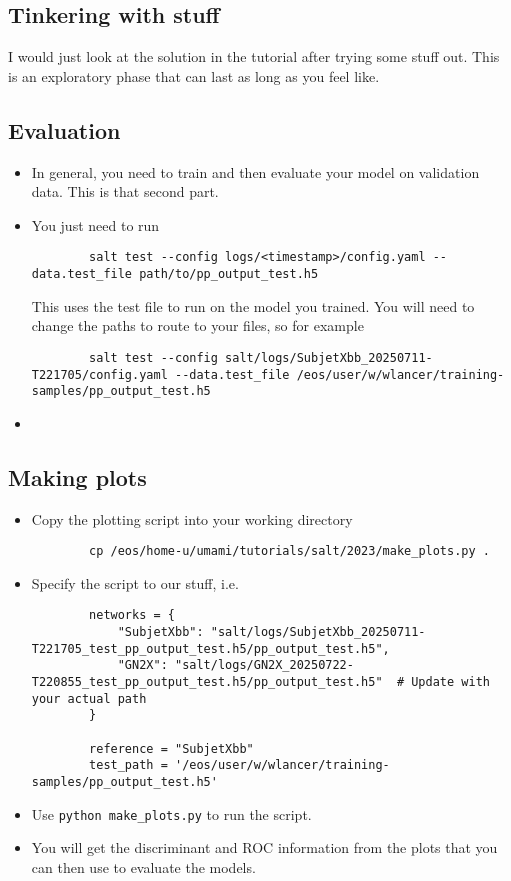 \documentclass[11pt]{article}
\begin{document}
\subsection{Tinkering with stuff}

I would just look at the solution in the tutorial after trying 
some stuff out. This is an exploratory phase that can last as long
as you feel like.

\subsection{Evaluation}

\begin{itemize}
    \item In general, you need to train and then evaluate your model on validation
    data. This is that second part.
    \item You just need to run
    \begin{verbatim}
        salt test --config logs/<timestamp>/config.yaml --data.test_file path/to/pp_output_test.h5
    \end{verbatim}
    This uses the test file to run on the model you trained. You will
    need to change the paths to route to your files, so for example
    \begin{verbatim}
        salt test --config salt/logs/SubjetXbb_20250711-T221705/config.yaml --data.test_file /eos/user/w/wlancer/training-samples/pp_output_test.h5
    \end{verbatim}
    \item {}
\end{itemize}

\subsection{Making plots}

\begin{itemize}
    \item Copy the plotting script into your working directory
    \begin{verbatim}
        cp /eos/home-u/umami/tutorials/salt/2023/make_plots.py .
    \end{verbatim}
    \item Specify the script to our stuff, i.e.
    \begin{verbatim}
        networks = {
            "SubjetXbb": "salt/logs/SubjetXbb_20250711-T221705_test_pp_output_test.h5/pp_output_test.h5",
            "GN2X": "salt/logs/GN2X_20250722-T220855_test_pp_output_test.h5/pp_output_test.h5"  # Update with your actual path
        }   

        reference = "SubjetXbb"
        test_path = '/eos/user/w/wlancer/training-samples/pp_output_test.h5'
    \end{verbatim}
    \item Use \verb|python make_plots.py| to run the script.
    \item You will get the discriminant and ROC information from the
    plots that you can then use to evaluate the models.
\end{itemize}
\end{document}
